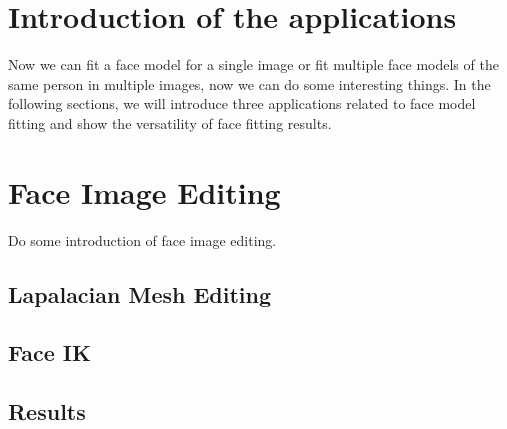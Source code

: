 \section{Introduction of the applications}
Now we can fit a face model for a single image or fit multiple face models of the same person in multiple images, now we can do some interesting things. In the following sections, we will introduce three applications related to face model fitting and show the versatility of face fitting results.

\section{Face Image Editing}
Do some introduction of face image editing.
\subsection{Lapalacian Mesh Editing}

\subsection{Face IK}

\subsection{Results}


